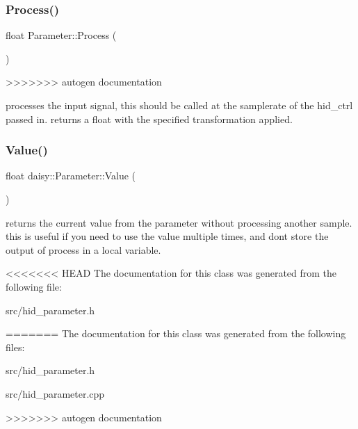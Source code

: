 \subsubsection{\texorpdfstring{Process()}{Process()}}
{\footnotesize\ttfamily float Parameter\+::\+Process (\begin{DoxyParamCaption}{ }\end{DoxyParamCaption})}
>>>>>>> autogen documentation

processes the input signal, this should be called at the samplerate of the hid\+\_\+ctrl passed in. returns a float with the specified transformation applied. \mbox{\label{classdaisy_1_1_parameter_a0599bc2fa6dae903698de8ee499a0306}} 
\subsubsection{\texorpdfstring{Value()}{Value()}}
{\footnotesize\ttfamily float daisy\+::\+Parameter\+::\+Value (\begin{DoxyParamCaption}{ }\end{DoxyParamCaption})\hspace{0.3cm}{\ttfamily [inline]}}

returns the current value from the parameter without processing another sample. this is useful if you need to use the value multiple times, and don\textquotesingle{}t store the output of process in a local variable. 

<<<<<<< HEAD
The documentation for this class was generated from the following file\+:\begin{DoxyCompactItemize}
\item 
src/hid\+\_\+parameter.\+h\end{DoxyCompactItemize}
=======
The documentation for this class was generated from the following files\+:\begin{DoxyCompactItemize}
\item 
src/hid\+\_\+parameter.\+h\item 
src/hid\+\_\+parameter.\+cpp\end{DoxyCompactItemize}
>>>>>>> autogen documentation
